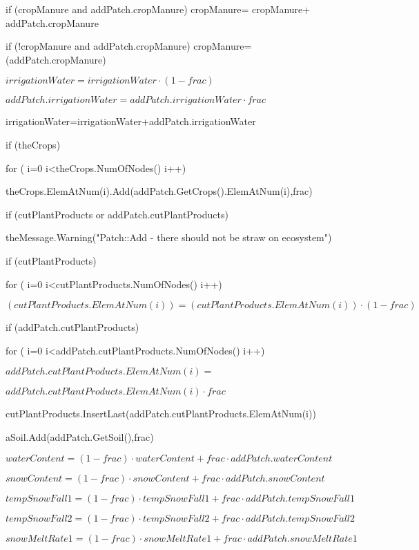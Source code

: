 \documentclass[%
]{scrartcl}
\begin{document}
  
   if (cropManure  and  addPatch.cropManure)
        cropManure=  cropManure+ addPatch.cropManure
  
  
   if (!cropManure  and  addPatch.cropManure)
        cropManure=  (addPatch.cropManure)

  $ irrigationWater=irrigationWater \cdot (1-frac)$

  $ addPatch.irrigationWater=addPatch.irrigationWater \cdot frac$

   irrigationWater=irrigationWater+addPatch.irrigationWater

   if (theCrops)

   	 \quad  for ( i=0 i<theCrops.NumOfNodes() i++)

	  \quad  \quad    	 theCrops.ElemAtNum(i).Add(addPatch.GetCrops().ElemAtNum(i),frac)
  
  
   if (cutPlantProducts or addPatch.cutPlantProducts)

  \quad 	theMessage.Warning("Patch::Add - there should not be straw on ecosystem")
  
  
   if (cutPlantProducts)
     
 \quad   for ( i=0 i<cutPlantProducts.NumOfNodes() i++)
      
         \quad  \quad    $(cutPlantProducts.ElemAtNum(i))=  (cutPlantProducts.ElemAtNum(i)) \cdot (1-frac)$
  
  
   if (addPatch.cutPlantProducts)

    \quad 	for ( i=0 i<addPatch.cutPlantProducts.NumOfNodes() i++)
      

    \quad    \quad     $ addPatch.cutPlantProducts.ElemAtNum(i)= $

\quad  \quad  \quad  $addPatch.cutPlantProducts.ElemAtNum(i) \cdot frac$
      
 \quad  \quad  	 cutPlantProducts.InsertLast(addPatch.cutPlantProducts.ElemAtNum(i))
      
 
  aSoil.Add(addPatch.GetSoil(),frac)
   
$waterContent = (1-frac) \cdot waterContent+frac \cdot addPatch.waterContent$
   
$snowContent = (1-frac) \cdot snowContent+frac \cdot addPatch.snowContent$
   
$tempSnowFall1 = (1-frac) \cdot tempSnowFall1+frac \cdot addPatch.tempSnowFall1$
  
 $tempSnowFall2 = (1-frac) \cdot tempSnowFall2+frac \cdot addPatch.tempSnowFall2$
  
 $snowMeltRate1 = (1-frac) \cdot snowMeltRate1+frac \cdot addPatch.snowMeltRate1$
 
\end{document}
